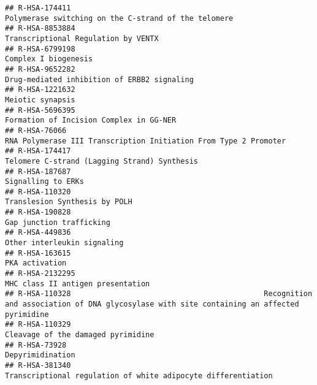 \documentclass[
]{article}
\begin{document}
\begin{verbatim}
## R-HSA-174411                                                                                  Polymerase switching on the C-strand of the telomere
## R-HSA-8853884                                                                                                  Transcriptional Regulation by VENTX
## R-HSA-6799198                                                                                                                 Complex I biogenesis
## R-HSA-9652282                                                                                          Drug-mediated inhibition of ERBB2 signaling
## R-HSA-1221632                                                                                                                     Meiotic synapsis
## R-HSA-5696395                                                                                              Formation of Incision Complex in GG-NER
## R-HSA-76066                                                                       RNA Polymerase III Transcription Initiation From Type 2 Promoter
## R-HSA-174417                                                                                          Telomere C-strand (Lagging Strand) Synthesis
## R-HSA-187687                                                                                                                    Signalling to ERKs
## R-HSA-110320                                                                                                         Translesion Synthesis by POLH
## R-HSA-190828                                                                                                              Gap junction trafficking
## R-HSA-449836                                                                                                           Other interleukin signaling
## R-HSA-163615                                                                                                                        PKA activation
## R-HSA-2132295                                                                                                    MHC class II antigen presentation
## R-HSA-110328                                            Recognition and association of DNA glycosylase with site containing an affected pyrimidine
## R-HSA-110329                                                                                                   Cleavage of the damaged pyrimidine 
## R-HSA-73928                                                                                                                       Depyrimidination
## R-HSA-381340                                                                         Transcriptional regulation of white adipocyte differentiation

\end{verbatim}
\end{document}
